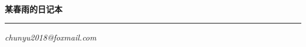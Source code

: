 \documentclass[UTF8,fontset=adobe,twoside]{ctexart}
\begin{document}
    \pagestyle{empty}           %

    \begin{titlepage}
        \  %

        \vspace{\fill}

        \begin{center}
            {\Huge\bfseries 某春雨的日记本} \\
            \rule[0.7em]{\linewidth}{0.5ex}
            

            {\normalsize\slshape chunyu2018@foxmail.com}
        \end{center}
    \end{titlepage}

    \cleardoublepage

    \setcounter{page}{1}        %
    \pagestyle{headings}        %

\end{document}
